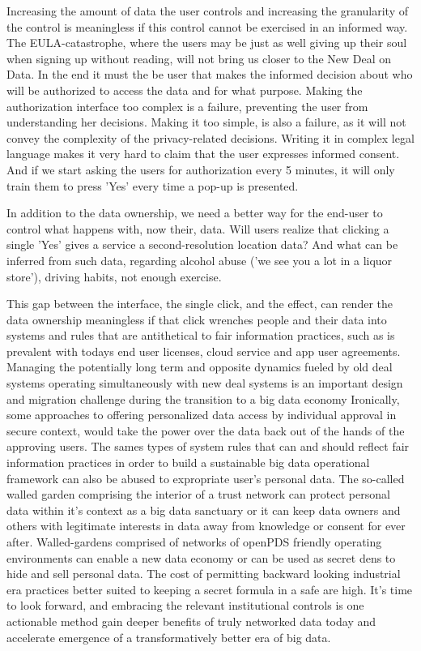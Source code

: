 Increasing the amount of data the user controls and increasing the granularity of the control is meaningless if this control cannot be exercised in an informed way.
The EULA-catastrophe, where the users may be just as well giving up their soul when signing up without reading, will not bring us closer to the New Deal on Data.
In the end it must the be user that makes the informed decision about who will be authorized to access the data and for what purpose. Making the authorization interface too complex is a failure, preventing the user from understanding her decisions.
Making it too simple, is also a failure, as it will not convey the complexity of the privacy-related decisions.
Writing it in complex legal language makes it very hard to claim that the user expresses informed consent.
And if we start asking the users for authorization every 5 minutes, it will only train them to press 'Yes' every time a pop-up is presented.

In addition to the data ownership, we need a better way for the end-user to control what happens with, now their, data.
Will users realize that clicking a single 'Yes' gives a service a second-resolution location data?
And what can be inferred from such data, regarding alcohol abuse ('we see you a lot in a liquor store'), driving habits, not enough exercise.

This gap between the interface, the single click, and the effect, can render the data ownership meaningless if that click wrenches people and their data into systems and rules that are antithetical to fair information practices, such as is prevalent with todays end user licenses, cloud service and app user agreements.
Managing the potentially long term and opposite dynamics fueled by old deal systems operating simultaneously with new deal systems is an important design and migration challenge during the transition to a big data economy
Ironically, some approaches to offering personalized data access by individual approval in secure context, would take the power over the data back out of the hands of the approving users.
The sames types of system rules that can and should reflect fair information practices in order to build a sustainable big data operational framework can also be abused to expropriate user's personal data.
The so-called walled garden comprising the interior of a trust network can protect personal data within it's context as a big data sanctuary or it can keep data owners and others with legitimate interests in data away from knowledge or consent for ever after.
Walled-gardens comprised of networks of openPDS friendly operating environments can enable a new data economy or can be used as secret dens to hide and sell personal data.
The cost of permitting backward looking industrial era practices better suited to keeping a secret formula in a safe are high.
It's time to look forward, and embracing the relevant institutional controls is one actionable method gain deeper benefits of truly networked data today and accelerate emergence of a transformatively better era of big data.

